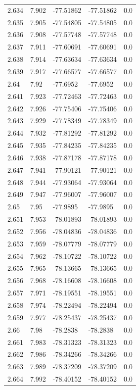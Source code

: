 \begin{tabular}{lllll}
2.634 & 7.902 & -77.51862 & -77.51862 & 0.0 \\
2.635 & 7.905 & -77.54805 & -77.54805 & 0.0 \\
2.636 & 7.908 & -77.57748 & -77.57748 & 0.0 \\
2.637 & 7.911 & -77.60691 & -77.60691 & 0.0 \\
2.638 & 7.914 & -77.63634 & -77.63634 & 0.0 \\
2.639 & 7.917 & -77.66577 & -77.66577 & 0.0 \\
2.64 & 7.92 & -77.6952 & -77.6952 & 0.0 \\
2.641 & 7.923 & -77.72463 & -77.72463 & 0.0 \\
2.642 & 7.926 & -77.75406 & -77.75406 & 0.0 \\
2.643 & 7.929 & -77.78349 & -77.78349 & 0.0 \\
2.644 & 7.932 & -77.81292 & -77.81292 & 0.0 \\
2.645 & 7.935 & -77.84235 & -77.84235 & 0.0 \\
2.646 & 7.938 & -77.87178 & -77.87178 & 0.0 \\
2.647 & 7.941 & -77.90121 & -77.90121 & 0.0 \\
2.648 & 7.944 & -77.93064 & -77.93064 & 0.0 \\
2.649 & 7.947 & -77.96007 & -77.96007 & 0.0 \\
2.65 & 7.95 & -77.9895 & -77.9895 & 0.0 \\
2.651 & 7.953 & -78.01893 & -78.01893 & 0.0 \\
2.652 & 7.956 & -78.04836 & -78.04836 & 0.0 \\
2.653 & 7.959 & -78.07779 & -78.07779 & 0.0 \\
2.654 & 7.962 & -78.10722 & -78.10722 & 0.0 \\
2.655 & 7.965 & -78.13665 & -78.13665 & 0.0 \\
2.656 & 7.968 & -78.16608 & -78.16608 & 0.0 \\
2.657 & 7.971 & -78.19551 & -78.19551 & 0.0 \\
2.658 & 7.974 & -78.22494 & -78.22494 & 0.0 \\
2.659 & 7.977 & -78.25437 & -78.25437 & 0.0 \\
2.66 & 7.98 & -78.2838 & -78.2838 & 0.0 \\
2.661 & 7.983 & -78.31323 & -78.31323 & 0.0 \\
2.662 & 7.986 & -78.34266 & -78.34266 & 0.0 \\
2.663 & 7.989 & -78.37209 & -78.37209 & 0.0 \\
2.664 & 7.992 & -78.40152 & -78.40152 & 0.0 \\

\end{tabular}
